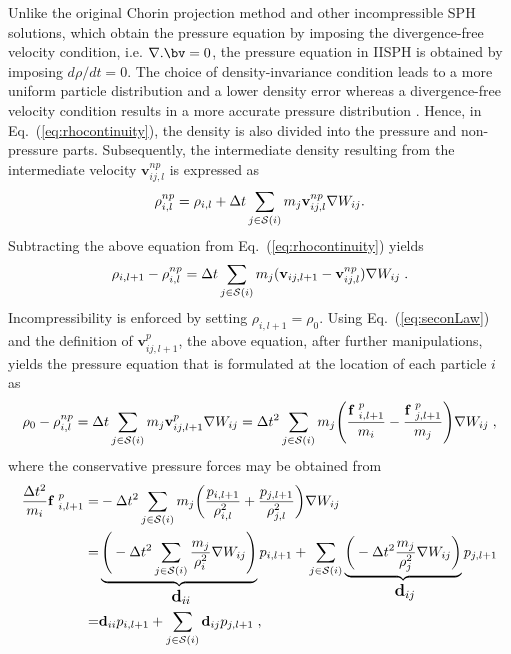 Unlike the original Chorin projection method and other incompressible SPH solutions, which obtain the pressure equation by imposing the divergence-free velocity condition, i.e.  $\nabla.\bv= 0$, the pressure equation in IISPH is obtained by imposing $d\rho/dt=0$. The choice of density-invariance condition leads to a more uniform particle distribution and a lower density error whereas a divergence-free velocity condition results in a more accurate pressure distribution \cite{asai2012stabilized}. Hence, in Eq.~(\ref{eq:rhocontinuity}), the density is also divided into the pressure and non-pressure parts. Subsequently, the intermediate density resulting from the intermediate velocity $\mathbf v_{ij,l}^{np}$ is expressed as
\begin{equation}\label{eq:rhonp}
\rho_{i,l}^{np}=\rho_{i,l}+\Delta t \sum_{j \in {\cal S}(i)} m_j \mathbf v_{ij,l}^{np}\nabla W_{ij}.
\end{equation}
Subtracting the above equation from Eq.~(\ref{eq:rhocontinuity}) yields
\begin{equation}\label{eq:continuity3}
\rho_{i,l+1}- \rho_{i,l}^{np}=\Delta t \sum_{j \in {\cal S}(i)} m_j (\mathbf v_{ij,l+1}-\mathbf v_{ij,l}^{np})\nabla W_{ij} \; .
\end{equation}
Incompressibility is enforced by setting $\rho_{i,l+1}= \rho _0 $. Using Eq.~(\ref{eq:seconLaw}) and the definition of $\mathbf v_{ij,l+1}^{p}$, the above equation, after further manipulations, yields the pressure equation that is formulated at the location of each particle $i$ as
\begin{equation}\label{eq:continuity4}
\rho _0- \rho_{i,l}^{np}=\Delta t \sum_{j \in {\cal S}(i)} m_j \mathbf v_{ij,l+1}^{p}\nabla W_{ij}
= \Delta t^2 \sum_{j \in {\cal S}(i)} m_j \Bigg(\frac{{\bf f}\;^{p}_{i,l+1}}{ m_i}-\frac{{\bf f}\;^{p}_{j,l+1}}{ m_j}\Bigg)\nabla W_{ij} \; ,
\end{equation}
where the conservative pressure forces may be obtained from \cite{ihmsen2014implicit}
\begin{equation}\label{eq:Fi}
\begin{split}
\frac{\Delta t^2}{m_i}  {\bf f}\;^{p}_{i,l+1}=& -\Delta t^2 \sum_{j \in {\cal S}(i)} m_j \bigg(\frac{p_{i,l+1}}{\rho_{i,l}^2}+\frac{p_{j,l+1}}{\rho_{j,l}^2}\bigg) \nabla W_{ij} \\=& \underbrace{\Bigg( -\Delta t^2    \sum_{j \in {\cal S}(i)}  \frac{m_j}{\rho_i^2} \nabla W_{ij}\Bigg)}_{\text{ \large $\mathbf{d}_{ii}$}  } p_{i,l+1} + \sum_{j \in {\cal S}(i)} \underbrace{ \bigg( -\Delta t^2 \frac{m_j}{\rho_j^2} \nabla W_{ij}\bigg)}_{\text{ \large $\mathbf{d}_{ij}$}}  p_{j,l+1}\\=& \mathbf{d}_{ii} p_{i,l+1}+\sum_{j \in {\cal S}(i)} \mathbf{d}_{ij} p_{j,l+1} \; ,
\end{split} 
\end{equation}
